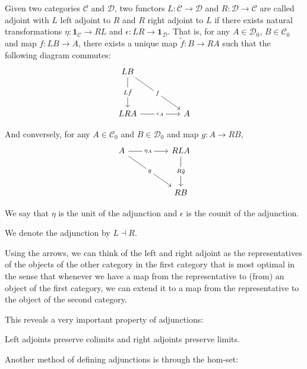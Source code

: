 \begin{definition}
    Given two categories $\mathcal{C}$ and $\mathcal{D}$,
    two functors $L:\mathcal{C}\to\mathcal{D}$ and $R:\mathcal{D}\to\mathcal{C}$
    are called adjoint with $L$ left adjoint to $R$ and $R$ right adjoint to $L$
    if there exists natural transformations $\eta:\mathbf{1}_{\mathcal{C}}\to RL$
    and $\epsilon:LR\to \mathbf{1}_{\mathcal{D}}$. That is, for any $A\in\mathcal{D}_0$,
    $B\in\mathcal{C}_0$ and map $f:LB\to A$,
    there exists a unique map $\tilde{f}:B\to RA$ such that
    the following diagram commutes:
    \[\begin{tikzcd}
        LB \\
        \\
        LRA && A
        \arrow["{L\tilde{f}}"{description}, from=1-1, to=3-1]
        \arrow["{\epsilon_A}"{description}, from=3-1, to=3-3]
        \arrow["f"{description}, from=1-1, to=3-3]
    \end{tikzcd}\]

    And conversely, for any $A\in\mathcal{C}_0$
    and $B\in\mathcal{D}_0$ and map $g:A\to RB$,
    \[\begin{tikzcd}
        A && RLA \\
        \\
        && RB
        \arrow["{\eta_A}"{description}, from=1-1, to=1-3]
        \arrow["{R\tilde{g}}"{description}, from=1-3, to=3-3]
        \arrow["g"{description}, from=1-1, to=3-3]
    \end{tikzcd}\]

    We say that $\eta$ is the unit of the adjunction and $\epsilon$ is 
    the counit of the adjunction.

    We denote the adjunction by $L\dashv R$.
\end{definition}
Using the arrows, we can think of the left and right adjoint as the representatives of
the objects of the other category in the first category that is most optimal in the sense
that whenever we have a map from the representative to (from) an object of the first category,
we can extend it to a map from the representative to the object of the second category.

This reveals a very important property of adjunctions:
\begin{theorem}
    Left adjoints preserve colimits and right adjoints preserve limits.
\end{theorem}

Another method of defining adjunctions is through the hom-set:

